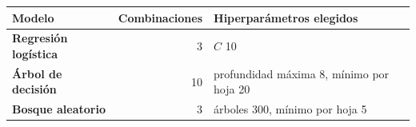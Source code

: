 \renewcommand{\arraystretch}{1.2}
\begin{tabular}{|l|r|>{\raggedright\arraybackslash}p{7.2cm}|}
\hline
\rowcolor{gray!20} \textbf{Modelo} & \textbf{Combinaciones} & \textbf{Hiperparámetros elegidos} \\
\hline
\textbf{Regresión logística} & 3 & $C$ 10 \\
\hline
\textbf{Árbol de decisión} & 10 & profundidad máxima 8, mínimo por hoja 20 \\
\hline
\textbf{Bosque aleatorio} & 3 & árboles 300, mínimo por hoja 5 \\
\hline
\end{tabular}

